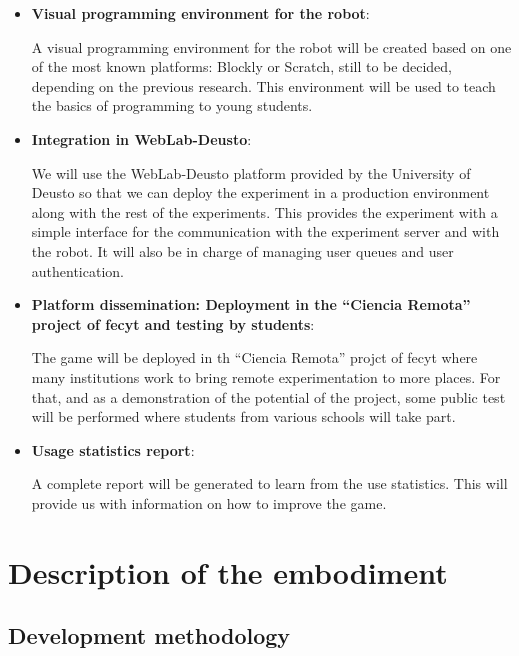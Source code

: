 \begin{itemize}
\item \textbf{Visual programming environment for the robot}:

A visual programming environment for the robot will be created based on one of the most known
platforms: Blockly or Scratch, still to be decided, depending on the previous research. This
environment will be used to teach the basics of programming to young students.

\item \textbf{Integration in WebLab-Deusto}:

We will use the WebLab-Deusto platform provided by the University of Deusto so that we can deploy
the experiment in a production environment along with the rest of the experiments. This provides the
experiment with a simple interface for the communication with the experiment server and with the
robot. It will also be in charge of managing user queues and user authentication.

\item \textbf{Platform dissemination: Deployment in the ``Ciencia Remota'' project of
\acrshort{fecyt} and testing by students}:

The game will be deployed in th ``Ciencia Remota'' projct of \acrshort{fecyt} where many
institutions work to bring remote experimentation to more places. For that, and as a demonstration
of the potential of the project, some public test will be performed where students from various
schools will take part.

\item \textbf{Usage statistics report}:

A complete report will be generated to learn from the use statistics. This will provide us with
information on how to improve the game.

\end{itemize}

\section{Description of the embodiment}

\subsection{Development methodology}

